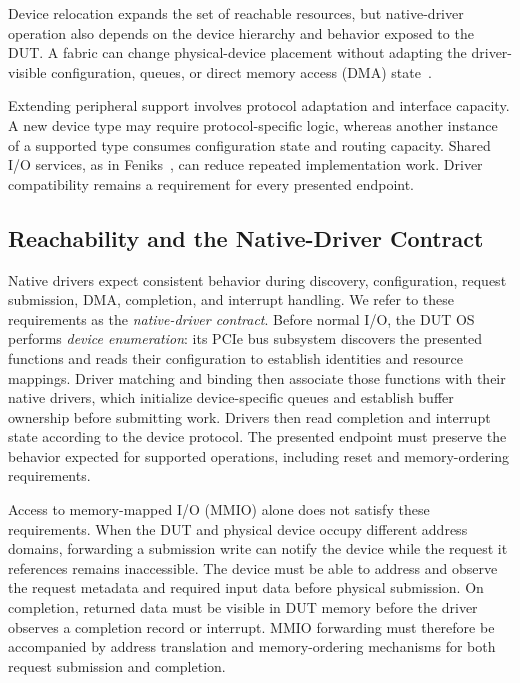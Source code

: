 Device relocation expands the set of reachable resources, but native-driver
operation also depends on the device hierarchy and behavior exposed to
the DUT. A fabric can change physical-device placement without adapting
the driver-visible configuration, queues, or direct memory access (DMA)
state~\cite{li2017composable,lim2024flexforge}.

Extending peripheral support involves protocol adaptation and interface
capacity. A new device type may require protocol-specific logic, whereas
another instance of a supported type consumes configuration state and
routing capacity. Shared I/O services, as in Feniks~\cite{zhang2017feniks},
can reduce repeated implementation work. Driver compatibility remains
a requirement for every presented endpoint.

\subsection{Reachability and the Native-Driver Contract}
\label{sec:native-driver-contract}

Native drivers expect consistent behavior during discovery, configuration,
request submission, DMA, completion, and interrupt handling. We refer to
these requirements as the \emph{native-driver contract}.
Before normal I/O, the DUT OS performs \emph{device enumeration}: its
PCIe bus subsystem discovers the presented functions and reads their
configuration to establish identities and resource mappings. Driver matching
and binding then associate those functions with their native drivers, which
initialize device-specific queues and establish buffer ownership before
submitting work.
Drivers then read completion and interrupt state according to the device
protocol. The presented endpoint must preserve the behavior expected for
supported operations, including reset and memory-ordering requirements.

Access to memory-mapped I/O (MMIO) alone does not satisfy these requirements.
When the DUT and physical device occupy different address domains, forwarding
a submission write can notify the device while the request it references
remains inaccessible. The device must be able to address and observe the
request metadata and required input data before physical submission. On
completion, returned data must be visible in DUT memory before the driver
observes a completion record or interrupt. MMIO forwarding must therefore
be accompanied by address translation and memory-ordering mechanisms for
both request submission and completion.

